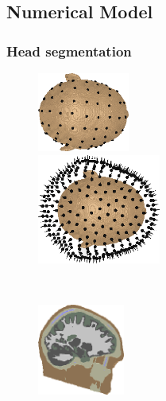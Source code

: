 \documentclass[5p]{elsarticle}
\begin{document}
\subsection{Numerical Model} 

\subsubsection{Head segmentation}

\begin{figure}[h!]
\begin{footnotesize}
\begin{center}
\begin{minipage}{3.8cm} \begin{center}
\includegraphics[height=2.6cm]{electrodes.png} 
\end{center}\end{minipage}
\begin{minipage}{3.8cm} \begin{center}
\includegraphics[height=3.6cm]{magnetometers.png}
\end{center}\end{minipage} \\ \mbox{} \vskip0.2cm \mbox{} 
\begin{minipage}{3.8cm} \begin{center}
\includegraphics[height=3.0cm]{1mm_mesh.png} 
\end{center}\end{minipage} 
\begin{minipage}{3.8cm} \begin{center}

\end{center}
\end{minipage}
\end{center}
\end{footnotesize}
\end{figure}
\end{document}
